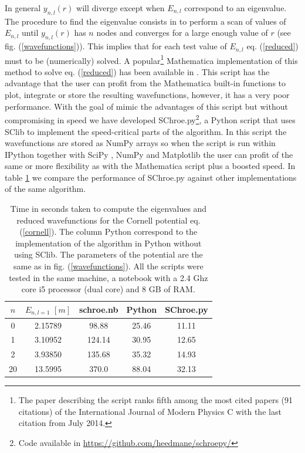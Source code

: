 \documentclass[10pt, a4paper, twocolumn]{article}
\begin{document}
{In general $y_{n,l}(r)$ will diverge except when $E_{n,l}$ correspond to an eigenvalue. The procedure to find the eigenvalue consists in to perform a scan of values of $E_{n,l}$ until $y_{n,l}(r)$  has $n$ nodes and converges for a large enough value of $r$ (see fig. (\ref{wavefunctions})). This implies that for each test value of $E_{n,l}$ eq. (\ref{reduced}) must to be (numerically) solved.
A popular\footnote{The paper describing the script ranks fifth among the most cited papers (91 citations) of the International Journal of Modern Physics C with the last citation from  July 2014.} Mathematica \cite{mathematica9} implementation of this method to solve eq. (\ref{reduced}) has been available in \cite{Lucha:1998xc}. This script has the advantage that the user can profit from the Mathematica built-in functions to plot, integrate or store the resulting wavefunctions, however, it has a very poor performance. With the goal of mimic the advantages of this script but without compromising in speed we have developed SChroe.py\footnote{Code available in \url{https://github.com/heedmane/schroepy/}}, a Python script that uses SClib to implement the speed-critical parts of the algorithm. In this script the wavefunctions are stored as NumPy arrays \cite{numpy} so when the script is run within IPython \cite{ipython} together with SciPy \cite{scipy}, NumPy and Matplotlib \cite{matplotlib} the user can profit of the same or more flexibility as with the Mathematica script plus a boosted speed. In table \ref{comparison} we compare the performance of SChroe.py against other implementations of the same algorithm.
\begin{table}[h]
	\centering
\begin{tabular}{c | c | c | c | c}
	$n$ & $E_{n,l=1}\,\,[m]$ & schroe.nb \cite{Lucha:1998xc} & Python & SChroe.py\\
	\hline
	\hline
0  & 2.15789 	& 98.88 & 25.46 & 11.11\\ 
1  & 3.10952	& 124.14 & 30.95 & 12.65\\ 
2  & 3.93850	& 135.68 & 35.32 & 14.93\\ 	
20 & 13.5995	& 370.0  & 88.04 & 32.13\\ 	
\end{tabular}
\caption{Time in seconds taken to compute the eigenvalues and reduced wavefunctions for the Cornell potential eq. (\ref{cornell}). The column Python correspond to the implementation of the algorithm in Python without using SClib. The parameters of the potential are the same as in fig. (\ref{wavefunctions}). All the scripts were tested in the same machine, a notebook with a 2.4 Ghz core i5 processor (dual core) and 8 GB of RAM.}
\label{comparison}
\end{table}

}
\end{document}
